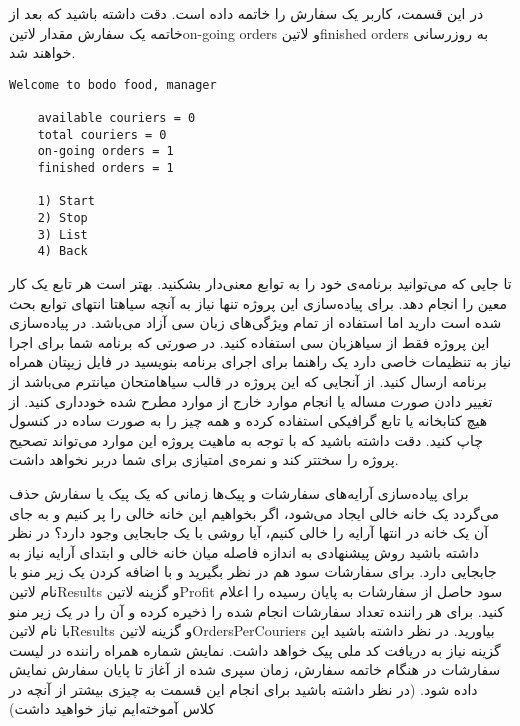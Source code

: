 \documentclass[../main.tex]{subfiles}
\begin{document}
در این قسمت، کاربر یک سفارش را خاتمه داده است. دقت داشته باشید که بعد از خاتمه یک سفارش مقدار ‌لاتین{on-going orders} و ‌لاتین{finished orders} به روزرسانی خواهند شد.

\begin{latin}
\begin{lstlisting}[]
    Welcome to bodo food, manager

    available couriers = 0
    total couriers = 0
    on-going orders = 1
    finished orders = 1

    1) Start
    2) Stop
    3) List
    4) Back
\end{lstlisting}
\end{latin}


     تا جایی که می‌توانید برنامه‌ی خود را به توابع معنی‌دار بشکنید. بهتر است هر تابع یک کار معین را انجام دهد.
     برای پیاده‌سازی این پروژه تنها نیاز به آنچه ‌سیاه{تا انتهای توابع} بحث شده است دارید اما استفاده از تمام ویژگی‌های زبان سی آزاد می‌باشد.
     در پیاده‌سازی این پروژه فقط از ‌سیاه{زبان سی} استفاده کنید. در صورتی که برنامه شما برای اجرا نیاز به تنظیمات خاصی دارد یک راهنما برای اجرای برنامه بنویسید در فایل زیپتان همراه برنامه ارسال کنید.
     از آنجایی که این پروژه در قالب ‌سیاه{امتحان میانترم} می‌باشد از تغییر دادن صورت مساله یا انجام موارد خارج از موارد مطرح شده خودداری کنید.
     از هیچ کتابخانه یا تابع گرافیکی استفاده کرده و همه چیز را به صورت ساده در کنسول چاپ کنید. دقت داشته باشید که با توجه به ماهیت پروژه این موارد می‌تواند تصحیح پروژه را سختتر کند و نمره‌ی امتیازی برای شما دربر نخواهد داشت.


     برای پیاده‌سازی آرایه‌های سفارشات و پیک‌ها زمانی که یک پیک یا سفارش حذف می‌گردد یک خانه خالی ایجاد می‌شود، اگر بخواهیم این خانه خالی را پر کنیم و به جای آن یک خانه در انتها آرایه را خالی کنیم، آیا روشی با یک جابجایی وجود دارد؟ در نظر داشته باشید روش پیشنهادی به اندازه فاصله میان خانه خالی و ابتدای آرایه نیاز به جابجایی دارد.
     برای سفارشات سود هم در نظر بگیرید و با اضافه کردن یک زیر منو با نام ‌لاتین{Results} و گزینه ‌لاتین{Profit} سود حاصل از سفارشات به پایان رسیده را اعلام کنید.
     برای هر راننده تعداد سفارشات انجام شده را ذخیره کرده و آن را در یک زیر منو با نام ‌لاتین{Results} و گزینه ‌لاتین{OrdersPerCouriers} بیاورید. در نظر داشته باشید این گزینه نیاز به دریافت کد ملی پیک خواهد داشت.
     نمایش شماره همراه راننده در لیست سفارشات
     در هنگام خاتمه سفارش، زمان سپری شده از آغاز تا پایان سفارش نمایش داده شود. (در نظر داشته باشید برای انجام این قسمت به چیزی بیشتر از آنچه در کلاس آموخته‌ایم نیاز خواهید داشت)
\end{document}
